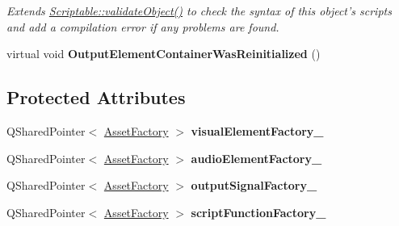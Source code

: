 \begin{DoxyCompactItemize}
\begin{DoxyCompactList}\small\item\em Extends \hyperlink{class_picto_1_1_scriptable_ab6e2944c43a3b5d418bf7b251594386d}{Scriptable\-::validate\-Object()} to check the syntax of this object's scripts and add a compilation error if any problems are found. \end{DoxyCompactList}\item 
\hypertarget{class_picto_1_1_output_element_container_a624ba445cfba00b2f3832bc01d460dc0}{virtual void {\bfseries Output\-Element\-Container\-Was\-Reinitialized} ()}\label{class_picto_1_1_output_element_container_a624ba445cfba00b2f3832bc01d460dc0}

\end{DoxyCompactItemize}
\subsection*{Protected Attributes}
\begin{DoxyCompactItemize}
\item 
\hypertarget{class_picto_1_1_output_element_container_a06053bf2033cc326dca71c1c36065dca}{Q\-Shared\-Pointer$<$ \hyperlink{class_picto_1_1_asset_factory}{Asset\-Factory} $>$ {\bfseries visual\-Element\-Factory\-\_\-}}\label{class_picto_1_1_output_element_container_a06053bf2033cc326dca71c1c36065dca}

\item 
\hypertarget{class_picto_1_1_output_element_container_ac7af3fe4134fdc30ee96ddb8c624e368}{Q\-Shared\-Pointer$<$ \hyperlink{class_picto_1_1_asset_factory}{Asset\-Factory} $>$ {\bfseries audio\-Element\-Factory\-\_\-}}\label{class_picto_1_1_output_element_container_ac7af3fe4134fdc30ee96ddb8c624e368}

\item 
\hypertarget{class_picto_1_1_output_element_container_aa02bedb7261fba8620d923ab0113ae3b}{Q\-Shared\-Pointer$<$ \hyperlink{class_picto_1_1_asset_factory}{Asset\-Factory} $>$ {\bfseries output\-Signal\-Factory\-\_\-}}\label{class_picto_1_1_output_element_container_aa02bedb7261fba8620d923ab0113ae3b}

\item 
\hypertarget{class_picto_1_1_output_element_container_a056dd5f88cea3cdf95e919b0e7d228b1}{Q\-Shared\-Pointer$<$ \hyperlink{class_picto_1_1_asset_factory}{Asset\-Factory} $>$ {\bfseries script\-Function\-Factory\-\_\-}}\label{class_picto_1_1_output_element_container_a056dd5f88cea3cdf95e919b0e7d228b1}

\end{DoxyCompactItemize}
